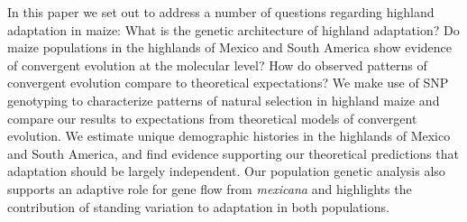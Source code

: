 In this paper we set out to address a number of questions regarding highland adaptation in maize: 
What is the genetic architecture of highland adaptation? 
Do maize populations in the highlands of Mexico and South America show evidence of convergent evolution at the molecular level? 
How do observed patterns of convergent evolution compare to theoretical expectations?
We make use of SNP genotyping to characterize patterns of natural selection in highland maize and compare our results to expectations from theoretical models of convergent evolution.  
We estimate unique demographic histories in the highlands of Mexico and South America, and find evidence supporting our theoretical predictions that adaptation should be largely independent. 
Our population genetic analysis also supports an adaptive role for gene flow from \emph{mexicana} and highlights the contribution of standing variation to adaptation in both populations.